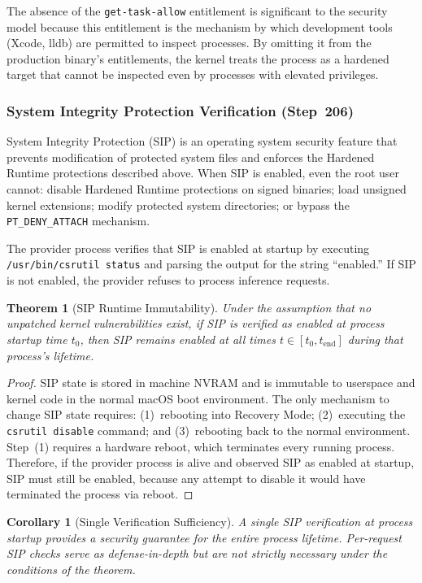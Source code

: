 \documentclass[11pt,letterpaper]{article}
\newtheorem{theorem}{Theorem}
\newtheorem{corollary}{Corollary}
\begin{document}
The absence of the \texttt{get-task-allow} entitlement is significant to the security model because this entitlement is the mechanism by which development tools (Xcode, lldb) are permitted to inspect processes. By omitting it from the production binary's entitlements, the kernel treats the process as a hardened target that cannot be inspected even by processes with elevated privileges.

\subsubsection{System Integrity Protection Verification (Step~206)}

System Integrity Protection (SIP) is an operating system security feature that prevents modification of protected system files and enforces the Hardened Runtime protections described above. When SIP is enabled, even the root user cannot: disable Hardened Runtime protections on signed binaries; load unsigned kernel extensions; modify protected system directories; or bypass the \texttt{PT\_DENY\_ATTACH} mechanism.

The provider process verifies that SIP is enabled at startup by executing \texttt{/usr/bin/csrutil status} and parsing the output for the string ``enabled.'' If SIP is not enabled, the provider refuses to process inference requests.

\begin{theorem}[SIP Runtime Immutability]
Under the assumption that no unpatched kernel vulnerabilities exist, if SIP is verified as enabled at process startup time $t_0$, then SIP remains enabled at all times $t \in [t_0, t_{\mathrm{end}}]$ during that process's lifetime.
\end{theorem}

\begin{proof}
SIP state is stored in machine NVRAM and is immutable to userspace and kernel code in the normal macOS boot environment. The only mechanism to change SIP state requires: (1)~rebooting into Recovery Mode; (2)~executing the \texttt{csrutil disable} command; and (3)~rebooting back to the normal environment. Step~(1) requires a hardware reboot, which terminates every running process. Therefore, if the provider process is alive and observed SIP as enabled at startup, SIP must still be enabled, because any attempt to disable it would have terminated the process via reboot.
\end{proof}

\begin{corollary}[Single Verification Sufficiency]
A single SIP verification at process startup provides a security guarantee for the entire process lifetime. Per-request SIP checks serve as defense-in-depth but are not strictly necessary under the conditions of the theorem.
\end{corollary}
\end{document}
